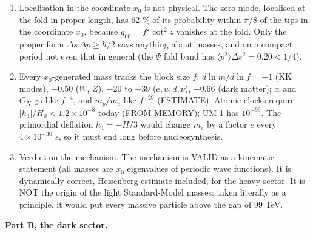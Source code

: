 \documentclass[11pt]{article}
\begin{document}
\begin{enumerate}
\item Localisation in the coordinate $x_0$ is not physical. The zero mode, localised at the fold in proper length, has 62 \% of its probability within $\pi/8$ of the tips in the coordinate $x_0$, because $g_{00} = f^2\cot^2 z$ vanishes at the fold. Only the proper form $\Delta s\,\Delta p \geq \hbar/2$ says anything about masses, and on a compact period not even that in general (the $\Psi$ fold band has $\langle p^2\rangle\Delta s^2 = 0.20 < 1/4$).
\item Every $x_0$-generated mass tracks the block size $f$: $d\ln m/d\ln f = -1$ (KK modes), $-0.50$ ($W$, $Z$), $-20$ to $-39$ ($e, u, d, \nu$), $-0.66$ (dark matter); $\alpha$ and $G_N$ go like $f^{-4}$, and $m_p/m_e$ like $f^{-29}$ (ESTIMATE). Atomic clocks require $|h_4|/H_0 < 1.2\times10^{-8}$ today (FROM MEMORY); UM-1 has $10^{-93}$. The primordial deflation $h_4 = -H/3$ would change $m_e$ by a factor $e$ every $4\times10^{-30}$ s, so it must end long before nucleosynthesis.
\item Verdict on the mechanism. The mechanism is VALID as a kinematic statement (all masses are $x_0$ eigenvalues of periodic wave functions). It is dynamically correct, Heisenberg estimate included, for the heavy sector. It is NOT the origin of the light Standard-Model masses: taken literally as a principle, it would put every massive particle above the gap of 99 TeV.
\end{enumerate}

\textbf{Part B, the dark sector.}
\end{document}

